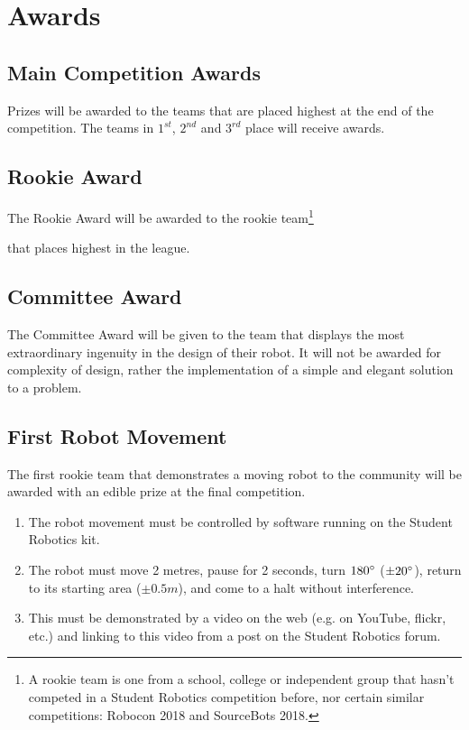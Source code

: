 \section {Awards}
\label{sec:Awards}

\subsection{Main Competition Awards}
Prizes will be awarded to the teams that are placed highest at the end of the competition.
The teams in $1^{st}$, $2^{nd}$ and $3^{rd}$ place will receive awards.

\subsection{Rookie Award}
The Rookie Award will be awarded to the rookie
team\footnote{A rookie team is one from a school, college or independent group that hasn't competed in a Student Robotics competition before, nor certain similar competitions: Robocon 2018 and SourceBots 2018.}\addtocounter{footnote}{-1}\addtocounter{Hfootnote}{-1}
 that places highest in the league.

\subsection{Committee Award}
The Committee Award will be given to the team that displays the most extraordinary ingenuity in the design of their robot.
It will not be awarded for complexity of design, rather the implementation of a simple and elegant solution to a problem.


\subsection{First Robot Movement}
The first rookie team\footnotemark{} that demonstrates a moving robot to the community will be awarded with an edible prize at the final competition.
\begin{enumerate}
\item The robot movement must be controlled by software running on the Student Robotics kit.
\item The robot must move 2 metres, pause for 2 seconds, turn $180\degree$ ($\pm20\degree$), return to its starting area ($\pm0.5m$), and come to a halt without interference.
\item This must be demonstrated by a video on the web (e.g. on YouTube, flickr, etc.) and linking to this video from a post on the Student Robotics forum.
\end{enumerate}

